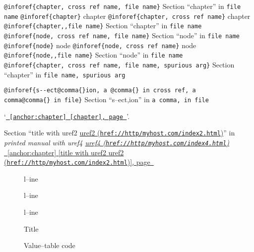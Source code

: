 \documentclass{book}
\begin{document}
\begin{titlepage}
\texttt{@inforef\{chapter,\ cross ref name,\ file name\}} Section ``chapter'' in \texttt{file name}
\texttt{@inforef\{chapter\}} chapter
\texttt{@inforef\{chapter,\ cross ref name\}} chapter
\texttt{@inforef\{chapter{,}{,}file name\}} Section ``chapter'' in \texttt{file name}
\texttt{@inforef\{node,\ cross ref name,\ file name\}} Section ``node'' in \texttt{file name}
\texttt{@inforef\{node\}} node
\texttt{@inforef\{node,\ cross ref name\}} node
\texttt{@inforef\{node{,}{,}file name\}} Section ``node'' in \texttt{file name}
\texttt{@inforef\{chapter,\ cross ref name,\ file name,\ spurious arg\}} Section ``chapter'' in \texttt{file name,\ spurious arg}

\texttt{@inforef\{s{-}{-}ect@comma\{\}ion,\ a @comma\{\}\ in cross
ref,\ a comma@comma\{\}\ in file\}}
Section ``s--ect,ion'' in \texttt{a comma,\ in file}

`\texttt{\hyperref[anchor:chapter]{\chaptername~\ref*{anchor:chapter} [chapter], page~\pageref*{anchor:chapter}}}'.

Section ``title with uref2 \href{href://http/myhost.com/index2.html}{uref2 (\nolinkurl{href://http/myhost.com/index2.html})}'' in \textsl{printed manual with uref4 \href{href://http/myhost.com/index4.html}{uref4 (\nolinkurl{href://http/myhost.com/index4.html})}}
\hyperref[anchor:chapter]{\chaptername~\ref*{anchor:chapter} [title with uref2 \href{href://http/myhost.com/index2.html}{uref2 (\nolinkurl{href://http/myhost.com/index2.html})}], page~\pageref*{anchor:chapter}}

\begin{description}
\item[{\parbox[b]{\linewidth}{%
\textbf{a--strong}}}]
l--ine
\end{description}

\begin{description}
\item[{\parbox[b]{\linewidth}{%
a--asis\\
\index[cp]{a--asis@\texttt{a{-}{-}asis}}%
b
\index[cp]{b@\texttt{b}}%
}}]
l--ine
\end{description}

\begin{description}
\item[{\parbox[b]{\linewidth}{%
\emph{a}\\
\index[fn]{a@\texttt{a}}%
\index[cp]{index entry between item and itemx}%
\emph{b}
\index[fn]{b@\texttt{b}}%
}}]
l--ine
\end{description}

\begin{description}
\item[] Title
\item[{\parbox[b]{\linewidth}{%
\texttt{a{-}{-}code}}}]
Value--table code
\end{description}


\end{titlepage}
\end{document}
